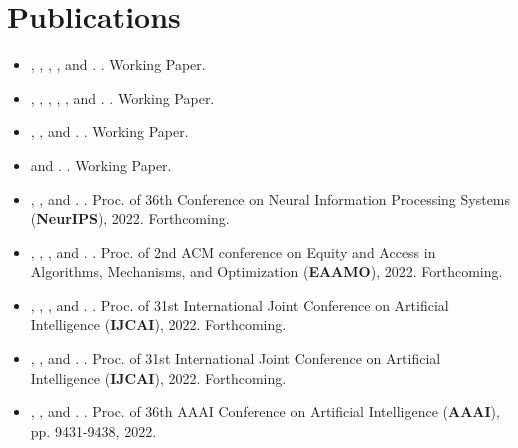 \documentclass{article}
\newcommand{\link}[2]{\iftoggle{uselinks}{\href{#1}{#2}}{#2}\xspace}
\newcommand{\itlink}[2]{\link{https://daniel-halpern.com/files/#1.pdf}{\textit{#2}}}
\newcommand{\me}{\link{https://daniel-halpern.com}{D. Halpern}}
\newcommand{\nisarg}{\link{https://www.cs.toronto.edu/~nisarg}{N. Shah}}
\newcommand{\ariel}{\link{http://procaccia.info}{A. D. Procaccia}}
\newcommand{\alex}{\link{https://www.alexpsomas.com}{A. Psomas}}
\newcommand{\greg}{\link{https://gregorykehne.com}{G. Kehne}}
\newcommand{\manon}{\link{https://manrev.github.io/manon/}{M. Revel}}
\newcommand{\tao}{\link{https://tao-l.github.io}{T. Lin}}
\newcommand{\jamie}{\link{http://www.jamie.tuckerfoltz.com}{J. Tucker-Foltz}}
\newcommand{\dad}{\link{https://www.cs.cornell.edu/home/halpern/}{J. Y. Halpern}}
\newcommand{\ali}{\link{https://jadbabaie.mit.edu}{A. Jadbabaie}}
\newcommand{\elchanan}{\link{https://math.mit.edu/~elmos/}{E. Mossel}}
\newcommand{\allan}{\link{https://www.cs.toronto.edu/~bor/}{A. Borodin}}
\newcommand{\mohamad}{\link{https://www.cs.toronto.edu/~latifian/}{M. Latifian}}
\newcommand{\bailey}{\link{https://sites.google.com/andrew.cmu.edu/baileyflanigan/home}{B. Flanigan}}
\newcommand{\adam}{\link{https://polisci.mit.edu/people/adam-berinsky}{A. Berinsky}}
\newcommand{\gerdus}{\link{http://www.gerdusbenade.com}{G. Benadè}}
\newcommand{\manuel}{\link{https://ei.is.mpg.de/~mwuthrich}{M. W\"uthrich}}
\begin{document}
    \section{Publications}
    \begin{itemize}
        \setlength\itemsep{.8ex}
        \item \me, \greg, \ariel, \jamie, and \manuel. \itlink{representation-incomplete}{Representation with Incomplete Votes}. Working Paper.
        \item \me, \dad, \ali, \elchanan, \ariel, and \manon. \itlink{liquid-defense}{In Defense of Liquid Democracy}. Working Paper.
        \item \bailey, \me, and \alex. \itlink{smoothed-analysis}{Smoothed Analysis of Social Choice Revisited}. Working Paper.

        \item \me and \ariel. \itlink{unbiased-information}{Unbiased Information Packets}. Working Paper.

        \item \gerdus, \me, and \alex. \itlink{dynamic-fair-division}{Dynamic Fair Division with Partial Information}. Proc. of 36th Conference on Neural Information Processing Systems (\textbf{NeurIPS}), 2022. Forthcoming.
        
        \item \manon, \me, \adam, and \ali. \itlink{liquid-in-practice}{Liquid Democracy in Practice: An Empirical Analysis of its Epistemic Performance}. Proc. of 2nd ACM conference on Equity and Access in Algorithms, Mechanisms, and Optimization (\textbf{EAAMO}), 2022. Forthcoming.

        \item \allan, \me, \mohamad, and \nisarg. \itlink{distortion-top-t}{Distortion in Voting with Top-t Preferences}. Proc. of 31st International Joint Conference on Artificial Intelligence (\textbf{IJCAI}), 2022. Forthcoming.
        
        \item \me, \greg, and \jamie. \itlink{buyers-reveal}{Can Buyers Reveal for a Better Deal?}. Proc. of 31st International Joint Conference on Artificial Intelligence (\textbf{IJCAI}), 2022. Forthcoming.
        
        \item \manon, \tao, and \me. \itlink{optimal-congress}{How Many Representatives Do We Need? The Optimal Size of an Epistemic Congress}.
        Proc. of 36th AAAI Conference on Artificial Intelligence (\textbf{AAAI}), pp. 9431-9438, 2022. 
        

\end{itemize}
\end{document}
